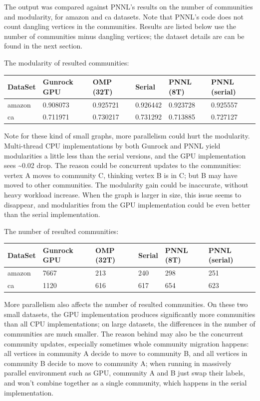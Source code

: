 \documentclass[10pt,article,oneside]{memoir}
\begin{document}
The output was compared against PNNL's results on the number of
communities and modularity, for amazon and ca datasets. Note that PNNL's
code does not count dangling vertices in the communities. Results are
listed below use the number of communities minus dangling vertices; the
dataset details are can be found in the next section.

The modularity of resulted communities:

\begin{longtable}[c]{@{}llllll@{}}
\toprule
DataSet & Gunrock GPU & OMP (32T) & Serial & PNNL (8T) & PNNL
(serial)\tabularnewline
\midrule
\endhead
amazon & 0.908073 & 0.925721 & 0.926442 & 0.923728 &
0.925557\tabularnewline
ca & 0.711971 & 0.730217 & 0.731292 & 0.713885 & 0.727127\tabularnewline
\bottomrule
\end{longtable}

Note for these kind of small graphs, more parallelism could hurt the
modularity. Multi-thread CPU implementations by both Gunrock and PNNL
yield modularities a little less than the serial versions, and the GPU
implementation sees \textasciitilde{}0.02 drop. The reason could be
concurrent updates to the communities: vertex A moves to community C,
thinking vertex B is in C; but B may have moved to other communities.
The modularity gain could be inaccurate, without heavy workload
increase. When the graph is larger in size, this issue seems to
disappear, and modularities from the GPU implementation could be even
better than the serial implementation.

The number of resulted communities:

\begin{longtable}[c]{@{}llllll@{}}
\toprule
DataSet & Gunrock GPU & OMP (32T) & Serial & PNNL (8T) & PNNL
(serial)\tabularnewline
\midrule
\endhead
amazon & 7667 & 213 & 240 & 298 & 251\tabularnewline
ca & 1120 & 616 & 617 & 654 & 623\tabularnewline
\bottomrule
\end{longtable}

More parallelism also affects the number of resulted communities. On
these two small datasets, the GPU implementation produces significantly
more communities than all CPU implementations; on large datasets, the
differences in the number of communities are much smaller. The reason
behind may also be the concurrent community updates, especially
sometimes whole community migration happens: all vertices in community A
decide to move to community B, and all vertices in community B decide to
move to community A; when running in massively parallel environment such
as GPU, community A and B just swap their labels, and won't combine
together as a single community, which happens in the serial
implementation.
\end{document}
